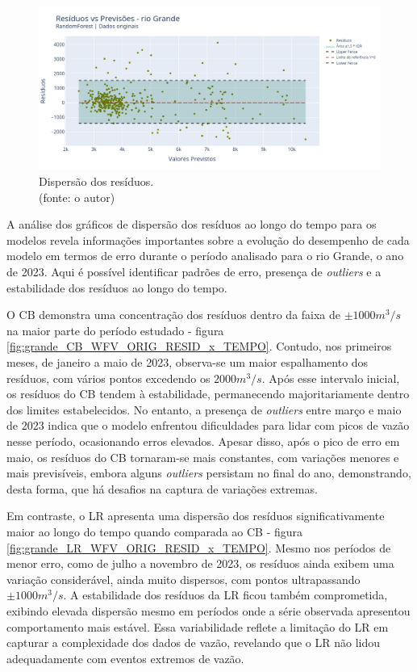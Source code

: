 \begin{figure}[!h]
	\centering
	\includegraphics[scale=0.33]{Figuras/rio_grande/wfv/RF/RF_WFV_ORIG_RESID_x_PREV.png}
	\caption{Dispersão dos resíduos.\\(fonte: o autor)}
	\label{fig:grande_RF_WFV_ORIG_RESID_x_PREV}
\end{figure}
\clearpage

A análise dos gráficos de dispersão dos resíduos ao longo do tempo para os modelos revela informações importantes sobre a evolução do desempenho de cada modelo em termos de erro durante o período analisado para o rio Grande, o ano de 2023. Aqui é possível identificar padrões de erro, presença de \textit{outliers} e a estabilidade dos resíduos ao longo do tempo.

O CB demonstra uma concentração dos resíduos dentro da faixa de $\pm 1000 m^3/s$ na maior parte do período estudado - figura \ref{fig:grande_CB_WFV_ORIG_RESID_x_TEMPO}. Contudo, nos primeiros meses, de janeiro a maio de 2023, observa-se um maior espalhamento dos resíduos, com vários pontos excedendo os $2000 m^3/s$. Após esse intervalo inicial, os resíduos do CB tendem à estabilidade, permanecendo majoritariamente dentro dos limites estabelecidos. No entanto, a presença de \textit{outliers} entre março e maio de 2023 indica que o modelo enfrentou dificuldades para lidar com picos de vazão nesse período, ocasionando erros elevados. Apesar disso, após o pico de erro em maio, os resíduos do CB tornaram-se mais constantes, com variações menores e mais previsíveis, embora alguns \textit{outliers} persistam no final do ano, demonstrando, desta forma, que há desafios na captura de variações extremas.

Em contraste, o LR apresenta uma dispersão dos resíduos significativamente maior ao longo do tempo quando comparada ao CB - figura \ref{fig:grande_LR_WFV_ORIG_RESID_x_TEMPO}. Mesmo nos períodos de menor erro, como de julho a novembro de 2023, os resíduos ainda exibem uma variação considerável, ainda muito dispersos, com pontos ultrapassando $\pm 1000 m^3/s$. A estabilidade dos resíduos da LR ficou também comprometida, exibindo elevada dispersão mesmo em períodos onde a série observada apresentou comportamento mais estável. Essa variabilidade reflete a limitação do LR em capturar a complexidade dos dados de vazão, revelando que o LR não lidou adequadamente com eventos extremos de vazão.

